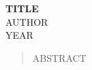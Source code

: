 \documentclass{article}
\begin{document}
\begin{center}
\Large{\textbf{TITLE}} \\ [0.2cm]
\small{\textsc{AUTHOR}} \\ [0.2cm]
\normalsize{\textsc{YEAR}} \\ [1cm]
\end{center}
\begin{abstract}
    ABSTRACT
\end{abstract}


\end{document}
